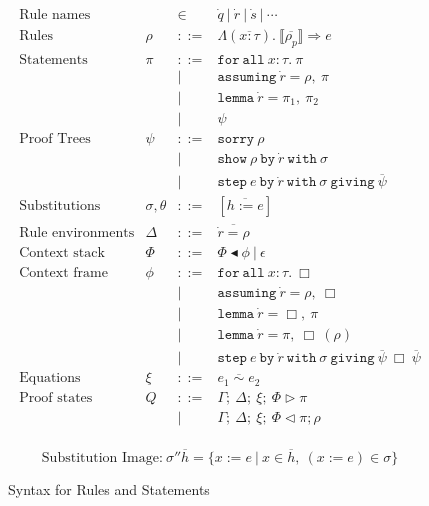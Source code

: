 \documentclass[a4paper]{jfp}
\begin{document}
\begin{figure}
        \small
        \caption{Syntax for Rules and Statements}
   	\begin{displaymath}
	\begin{array}{llcl}
           \text{Rule names} & & \in & \dot{q}\ |\ \dot{r}\ |\ \dot{s}\ |\ \cdots \\
           \text{Rules} & \rho & ::= & \Lambda(\overline{x : \tau}).\ \llbracket \overline{\rho_p} \rrbracket \Rightarrow e \\
           \text{Statements} & \pi & ::= & \mathtt{for\ all}\ x : \tau.\ \pi\ \\
                             &     &  |  & \mathtt{assuming}\ \dot{r} = \rho,\ \pi \\
                             &     &  |  & \mathtt{lemma}\ \dot{r} = \pi_1,\ \pi_2 \\
                             &     &  |  & \psi\ \\
           \text{Proof Trees} & \psi & ::= & \mathtt{sorry}\ \rho \\
                              &   & | & \mathtt{show}\ \rho\ \mathtt{by}\ \dot{r}\ \mathtt{with}\ \sigma \\
                              &   & | & \mathtt{step}\ e\ \mathtt{by}\ \dot{r}\ \mathtt{with}\ \sigma\ \mathtt{giving}\ \overline{\psi} \\
           \text{Substitutions} & \sigma, \theta & ::= & [\overline{h := e}] \\
           \text{Rule environments} & \Delta & ::= & \overline{\dot{r} = \rho} \\
           \text{Context stack} & \Phi & ::= & \Phi \blacktriangleleft \phi\ |\ \epsilon \\
           \text{Context frame} & \phi & ::= & \mathtt{for\ all}\ x : \tau.\ \Box \\
                                &      &  |  & \mathtt{assuming}\ \dot{r} = \rho,\ \Box \\
                                &      &  |  & \mathtt{lemma}\ \dot{r} = \Box,\ \pi \\
                                &      &  |  & \mathtt{lemma}\ \dot{r} = \pi,\ \Box\ (\rho) \\
                                &      &  |  & \mathtt{step}\ e\ \mathtt{by}\ \dot{r}\ \mathtt{with}\ 
           \sigma\ \mathtt{giving}\ \overline{\psi}\ \Box\ \overline{\psi} \\
           \text{Equations}     & \xi  & ::=  & \overline{e_1 \sim e_2} \\
           \text{Proof states} & Q & ::= & \Gamma ;\ \Delta ;\ \xi ;\ \Phi \triangleright \pi \\
                               &   &  |  & \Gamma ;\ \Delta ;\ \xi ;\ \Phi \triangleleft \pi ; \rho \\ 
	\end{array}
	\end{displaymath}

   $$
   \text{Substitution Image:}\ \sigma '' \overline{h} = \{ x := e\ |\ x \in \overline{h},\ (x := e) \in \sigma \}
   $$

        \label{fig:rules}
\end{figure}
\end{document}
